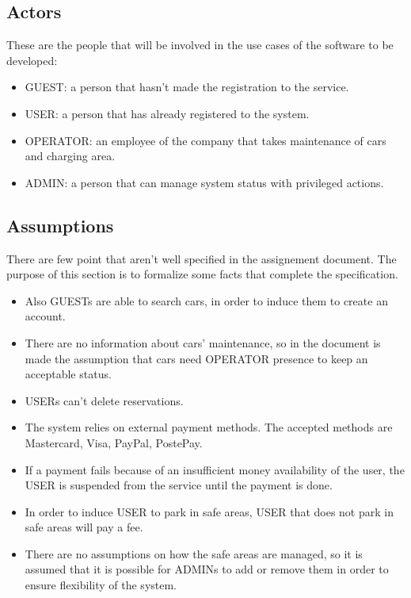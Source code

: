 \subsection{Actors}

These are the people that will be involved in the use cases of the
software to be developed:
\begin{itemize}
\item GUEST: a person that hasn't made the registration to the service.
\item USER: a person that has already registered to the system.
\item OPERATOR: an employee of the company that takes maintenance of cars
and charging area.
\item ADMIN: a person that can manage system status with privileged actions.
\end{itemize}

\subsection{Assumptions}

There are few point that aren't well specified in the assignement
document. The purpose of this section is to formalize some facts that
complete the specification.
\begin{itemize}
\item Also GUESTs are able to search cars, in order to induce them to create
an account.
\item There are no information about cars' maintenance, so in the document
is made the assumption that cars need OPERATOR presence to keep an
acceptable status.
\item USERs can't delete reservations.
\item The system relies on external payment methods. The accepted methods
are Mastercard, Visa, PayPal, PostePay.
\item If a payment fails because of an insufficient money availability of
the user, the USER is suspended from the service until the payment
is done.
\item In order to induce USER to park in safe areas, USER that does not
park in safe areas will pay a fee.
\item There are no assumptions on how the safe areas are managed, so it
is assumed that it is possible for ADMINs to add or remove them in
order to ensure flexibility of the system.
\end{itemize}

